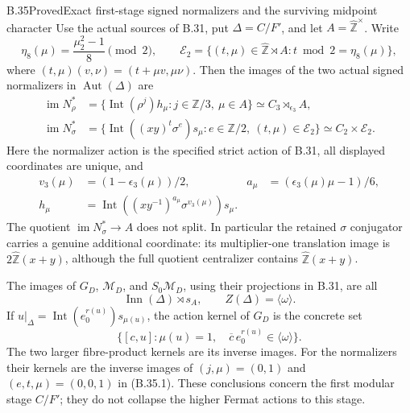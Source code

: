 \begin{statement}{B.35}{Proved}{Exact first-stage signed normalizers and the surviving midpoint character}
Use the actual sources of B.31, put $\Delta=C/F'$, and let
$A=\widehat{\mathbb Z}^{\times}$.  Write
\[
 \eta_8(\mu)=\frac{\mu_2^2-1}{8}\pmod2,
 \qquad
 \mathcal E_2=\{(t,\mu)\in\widehat{\mathbb Z}\rtimes A:
                         t\bmod2=\eta_8(\mu)\},
\]
where $(t,\mu)(v,\nu)=(t+\mu v,\mu\nu)$.
Then the images of the two actual signed normalizers in
$\operatorname{Aut}(\Delta)$ are
\[
\begin{aligned}
 \operatorname{im}N_\rho^*
   &=\{\operatorname{Int}(\rho^j)h_\mu:
                       j\in\mathbb Z/3,\ \mu\in A\}
     \simeq C_3\rtimes_{\epsilon_3}A,\\
 \operatorname{im}N_\sigma^*
   &=\{\operatorname{Int}((xy)^t\sigma^e)s_\mu:
              e\in\mathbb Z/2,\ (t,\mu)\in\mathcal E_2\}
     \simeq C_2\times\mathcal E_2.
                                                        \tag{B.35.1}
\end{aligned}
\]
Here the normalizer action is the specified strict action of B.31,
all displayed coordinates are unique, and
\[
 \begin{aligned}
 v_3(\mu)&=(1-\epsilon_3(\mu))/2,&
 a_\mu&=(\epsilon_3(\mu)\mu-1)/6,\\
 h_\mu&=\operatorname{Int}((xy^{-1})^{a_\mu}
                         \sigma^{v_3(\mu)})s_\mu.
 \end{aligned}
                                                        \tag{B.35.2}
\]
The quotient $\operatorname{im}N_\sigma^*\to A$ does not split.
In particular the retained $\sigma$ conjugator carries a genuine
additional coordinate: its multiplier-one translation image is
$2\widehat{\mathbb Z}(x+y)$, although the full quotient centralizer
contains $\widehat{\mathbb Z}(x+y)$.

The images of $G_D$, $\mathcal M_D$, and $S_0\mathcal M_D$,
using their projections in B.31, are all
\[
                  \operatorname{Inn}(\Delta)\rtimes s_A,
       \qquad Z(\Delta)=\langle\omega\rangle.             \tag{B.35.3}
\]
If $u|_\Delta=\operatorname{Int}(e_0^{r(u)})s_{\mu(u)}$,
the action kernel of $G_D$ is the concrete set
\[
 \{[c,u]:\mu(u)=1,\quad
                \overline c\,e_0^{r(u)}\in\langle\omega\rangle\}.
                                                        \tag{B.35.4}
\]
The two larger fibre-product kernels are its inverse images.
For the normalizers their kernels are the inverse images of
$(j,\mu)=(0,1)$ and $(e,t,\mu)=(0,0,1)$ in (B.35.1).
These conclusions concern the first modular stage $C/F'$;
they do not collapse the higher Fermat actions to this stage.
\end{statement}
